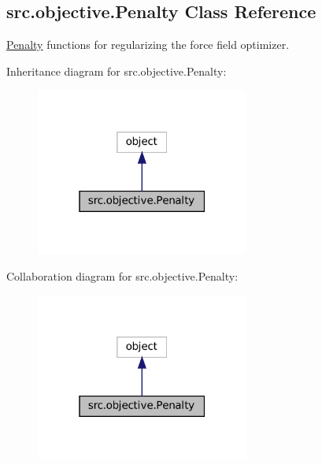 \hypertarget{classsrc_1_1objective_1_1Penalty}{}\subsection{src.\+objective.\+Penalty Class Reference}
\label{classsrc_1_1objective_1_1Penalty}


\hyperlink{classsrc_1_1objective_1_1Penalty}{Penalty} functions for regularizing the force field optimizer.  




Inheritance diagram for src.\+objective.\+Penalty\+:
\nopagebreak
\begin{figure}[H]
\begin{center}
\leavevmode
\includegraphics[width=199pt]{classsrc_1_1objective_1_1Penalty__inherit__graph}
\end{center}
\end{figure}


Collaboration diagram for src.\+objective.\+Penalty\+:
\nopagebreak
\begin{figure}[H]
\begin{center}
\leavevmode
\includegraphics[width=199pt]{classsrc_1_1objective_1_1Penalty__coll__graph}
\end{center}
\end{figure}
